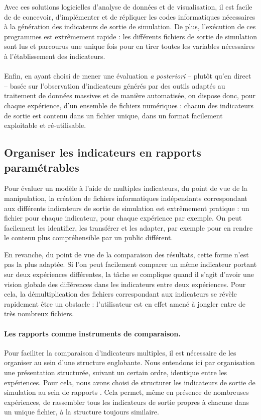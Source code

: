 Avec ces solutions logicielles d'analyse de données et de visualisation, il est facile de de concevoir, d'implémenter et de répliquer les codes informatiques nécessaires à la génération des indicateurs de sortie de simulation.
De plus, l'exécution de ces programmes est extrêmement rapide : les différents fichiers de sortie de simulation sont lus et parcourus une unique fois pour en tirer toutes les variables nécessaires à l'établissement des indicateurs.

\paragraph[Conclusion intermédiaire]{}
Enfin, en ayant choisi de mener une évaluation \textit{a posteriori} -- plutôt qu'en direct -- basée sur l'observation d'indicateurs générés par des outils adaptés au traitement de données massives et de manière automatisée, on dispose donc, pour chaque expérience, d'un ensemble de fichiers numériques : chacun des indicateurs de sortie est contenu dans un fichier unique, dans un format facilement exploitable et ré-utilisable. 

\subsection{Organiser les indicateurs en rapports paramétrables\label{subsec:organiser-indicateurs-rapports}}

Pour évaluer un modèle à l'aide de multiples indicateurs, du point de vue de la manipulation, la création de fichiers informatiques indépendants correspondant aux différents indicateurs de sortie de simulation est extrêmement pratique : un fichier pour chaque indicateur, pour chaque expérience par exemple.
On peut facilement les identifier, les transférer et les adapter, par exemple pour en rendre le contenu plus compréhensible par un public différent.

En revanche, du point de vue de la comparaison des résultats, cette forme n'est pas la plus adaptée.
Si l'on peut facilement comparer un même indicateur portant sur deux expériences différentes, la tâche se complique quand il s'agit d'avoir une vision globale des différences dans les indicateurs entre deux expériences.
Pour cela, la démultiplication des fichiers correspondant aux indicateurs se révèle rapidement être un obstacle : l'utilisateur est en effet amené à jongler entre de très nombreux fichiers.

\paragraph{Les rapports comme instruments de comparaison.}
Pour faciliter la comparaison d'indicateurs multiples, il est nécessaire de les organiser au sein d'une structure englobante.
Nous entendons ici par organisation une présentation structurée, suivant un certain ordre, identique entre les expériences.
Pour cela, nous avons choisi de structurer les indicateurs de sortie de simulation au sein de \og rapports \fg{}.
Cela permet, même en présence de nombreuses expériences, de rassembler tous les indicateurs de sortie propres à chacune dans un unique fichier, à la structure toujours similaire.

